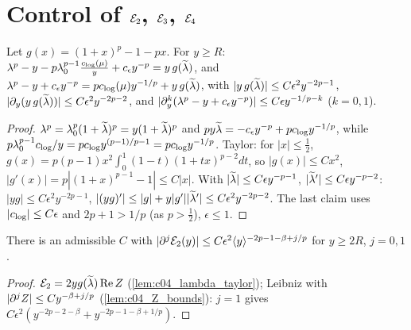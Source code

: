 \section{Control of $\mc E_2$, $\mathcal{E}_3$, $\mathcal{E}_4$}

\begin{lemma}
  \label{lem:c04_lambda_taylor}
  Let $g(x)=(1+x)^p-1-px$. For $y\ge R$:
  $\lambda^p-y-p\lambda_0^{p-1}\frac{c_{\textup{log}}(\mu)}y+c_\epsilon y^{-p}=y\,g(\widetilde{\lambda})$, and
  $\lambda^p-y+c_\epsilon y^{-p}=pc_{\textup{log}}(\mu)y^{-1/p}+y\,g(\widetilde{\lambda})$, with
  $|y\,g(\widetilde{\lambda})|\le C\epsilon^2y^{-2p-1}$, $|\partial_y(y\,g(\widetilde{\lambda}))|\le C\epsilon^2y^{-2p-2}$, and
  $|\partial_y^k(\lambda^p-y+c_\epsilon y^{-p})|\le C\epsilon y^{-1/p-k}$ ($k=0,1$).
\end{lemma}
\begin{proof}
  $\lambda^p=\lambda_0^p(1+\widetilde{\lambda})^p=y(1+\widetilde{\lambda})^p$ and $py\widetilde{\lambda}=-c_\epsilon y^{-p}+pc_{\textup{log}}y^{-1/p}$, while
  $p\lambda_0^{p-1}c_{\textup{log}}/y=pc_{\textup{log}}y^{(p-1)/p-1}=pc_{\textup{log}}y^{-1/p}$. Taylor: for $|x|\le\frac12$,
  $g(x)=p(p-1)x^2\int_0^1(1-t)(1+tx)^{p-2}dt$, so $|g(x)|\le Cx^2$, $|g'(x)|=p|(1+x)^{p-1}-1|\le C|x|$. With $|\widetilde{\lambda}|\le C\epsilon y^{-p-1}$,
  $|\widetilde{\lambda}'|\le C\epsilon y^{-p-2}$: $|yg|\le C\epsilon^2y^{-2p-1}$, $|(yg)'|\le|g|+y|g'||\widetilde{\lambda}'|\le C\epsilon^2y^{-2p-2}$. The last claim uses
  $|c_{\textup{log}}|\le C\epsilon$ and $2p+1>1/p$ (as $p>\frac12$), $\epsilon\le1$.
\end{proof}

\begin{proposition}[Control of $\mc E_2$]
  \label{prop:approx_E2}
  There is an admissible $C$ with $|\partial^j\mathcal{E}_2(y)|\le C\epsilon^2\langle y \rangle^{-2p-1-\beta+j/p}$ for $y\ge2R$, $j=0,1$.
\end{proposition}
\begin{proof}
  $\mathcal{E}_2=2yg(\widetilde{\lambda})\operatorname{Re}Z$ (\cref{lem:c04_lambda_taylor}); Leibniz with $|\partial^jZ|\le Cy^{-\beta+j/p}$ (\cref{lem:c04_Z_bounds}):
  $j=1$ gives $C\epsilon^2(y^{-2p-2-\beta}+y^{-2p-1-\beta+1/p})$.
\end{proof}

